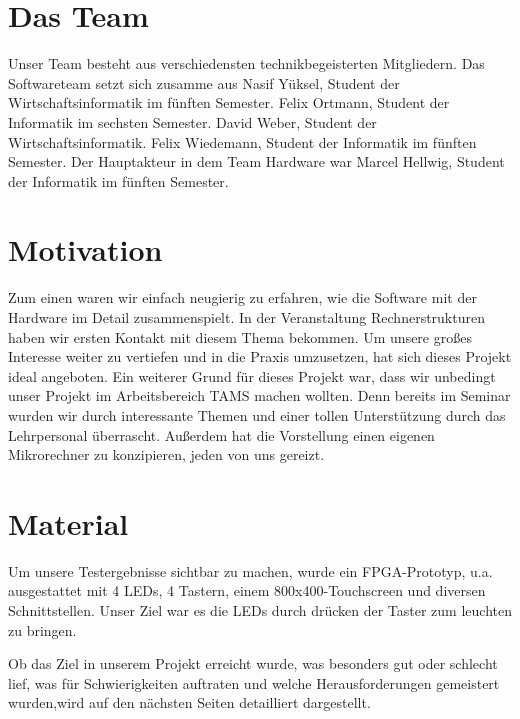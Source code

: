 \section{Das Team}
Unser Team besteht aus verschiedensten technikbegeisterten Mitgliedern. Das Softwareteam setzt sich zusamme aus Nasif Yüksel, Student der Wirtschaftsinformatik im fünften Semester.  Felix Ortmann, Student der Informatik im sechsten Semester. David Weber, Student der Wirtschaftsinformatik. Felix Wiedemann, Student der Informatik im fünften Semester. Der Hauptakteur in dem Team Hardware war Marcel Hellwig, Student der Informatik im fünften Semester.

\section{Motivation}
Zum einen waren wir einfach neugierig zu erfahren, wie die Software mit der Hardware im Detail zusammenspielt. In der Veranstaltung Rechnerstrukturen haben wir ersten Kontakt mit diesem Thema bekommen. Um unsere großes Interesse weiter zu vertiefen und in die Praxis umzusetzen, hat sich dieses Projekt ideal angeboten.
Ein weiterer Grund für dieses Projekt war, dass wir unbedingt unser Projekt im Arbeitsbereich TAMS machen wollten. Denn bereits im Seminar wurden wir durch interessante Themen und einer tollen Unterstützung durch das Lehrpersonal überrascht.
Außerdem hat die Vorstellung einen eigenen Mikrorechner zu konzipieren, jeden von uns gereizt.

\section{Material}
Um unsere Testergebnisse sichtbar zu machen, wurde ein FPGA-Prototyp, u.a. ausgestattet mit 4 LEDs, 4 Tastern, einem 800x400-Touchscreen und diversen Schnittstellen. Unser Ziel war es die LEDs durch drücken der Taster zum leuchten zu bringen. 

Ob das Ziel in unserem Projekt erreicht wurde, was besonders gut oder schlecht lief,  was für Schwierigkeiten auftraten und welche Herausforderungen gemeistert wurden,wird auf den nächsten Seiten detailliert dargestellt. 
